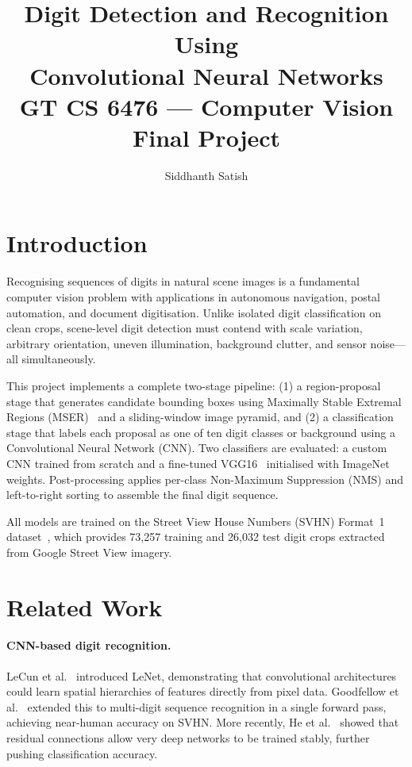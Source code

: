 \documentclass[10pt,twocolumn]{article}
\title{\textbf{Digit Detection and Recognition Using\\
Convolutional Neural Networks}\\
\large GT CS 6476 --- Computer Vision Final Project}
\author{Siddhanth Satish}
\date{}
\begin{document}
\maketitle

\section{Introduction}

Recognising sequences of digits in natural scene images is a fundamental
computer vision problem with applications in autonomous navigation, postal
automation, and document digitisation.
Unlike isolated digit classification on clean crops, scene-level digit
detection must contend with scale variation, arbitrary orientation, uneven
illumination, background clutter, and sensor noise---all simultaneously.

This project implements a complete two-stage pipeline:
(1) a region-proposal stage that generates candidate bounding boxes using
Maximally Stable Extremal Regions (MSER)~\cite{matas2004robust} and a
sliding-window image pyramid, and
(2) a classification stage that labels each proposal as one of ten digit
classes or background using a Convolutional Neural Network (CNN).
Two classifiers are evaluated: a custom CNN trained from scratch and a
fine-tuned VGG16~\cite{simonyan2015vgg} initialised with ImageNet weights.
Post-processing applies per-class Non-Maximum Suppression (NMS) and
left-to-right sorting to assemble the final digit sequence.

All models are trained on the Street View House Numbers (SVHN) Format~1
dataset~\cite{netzer2011svhn}, which provides 73,257 training and 26,032
test digit crops extracted from Google Street View imagery.

\section{Related Work}

\paragraph{CNN-based digit recognition.}
LeCun et al.~\cite{lecun1998gradient} introduced LeNet, demonstrating that
convolutional architectures could learn spatial hierarchies of features
directly from pixel data.
Goodfellow et al.~\cite{goodfellow2014multidigit} extended this to
multi-digit sequence recognition in a single forward pass, achieving
near-human accuracy on SVHN.
More recently, He et al.~\cite{he2016resnet} showed that residual
connections allow very deep networks to be trained stably, further pushing
classification accuracy.
\end{document}
